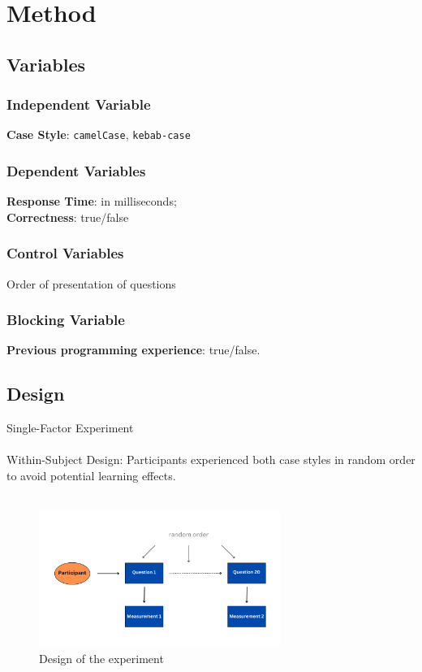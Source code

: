 \documentclass[unicode,11pt,a4paper,oneside,numbers=endperiod,openany]{scrartcl}
\begin{document}
\section{Method}

\subsection{Variables}
\subsubsection{Independent Variable} 
\textbf{Case Style}: \texttt{camelCase}, \texttt{kebab-case}

\subsubsection{Dependent Variables}
\textbf{Response Time}: in milliseconds; \\
\textbf{Correctness}: true/false

\subsubsection{Control Variables}
Order of presentation of questions

\subsubsection{Blocking Variable}
\textbf{Previous programming experience}: true/false.

\subsection{Design}
Single-Factor Experiment \\
\hfill \\
Within-Subject Design: Participants experienced both case styles in random order to avoid potential learning effects.
\\
\hfill \\
\begin{figure}[h!]
    \centering
    \includegraphics[width=0.7\textwidth]{./figures/graph.pdf}
    \caption{Design of the experiment}
    \label{fig:graph}
\end{figure}
\end{document}
